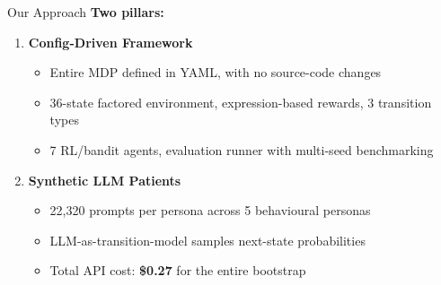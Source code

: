 \documentclass[aspectratio=169]{beamer}
\begin{document}
\begin{frame}{Our Approach}
    \textbf{Two pillars:}

    \vspace{4pt}
    \begin{enumerate}
        \item \textbf{Config-Driven Framework}
        \begin{itemize}
            \item Entire MDP defined in YAML, with no source-code changes
            \item 36-state factored environment, expression-based rewards, 3 transition types
            \item 7 RL/bandit agents, evaluation runner with multi-seed benchmarking
        \end{itemize}

        \item \textbf{Synthetic LLM Patients}
        \begin{itemize}
            \item 22{,}320 prompts per persona across 5 behavioural personas
            \item LLM-as-transition-model samples next-state probabilities
            \item Total API cost: \textbf{\$0.27} for the entire bootstrap
        \end{itemize}
    \end{enumerate}
\end{frame}
\end{document}
